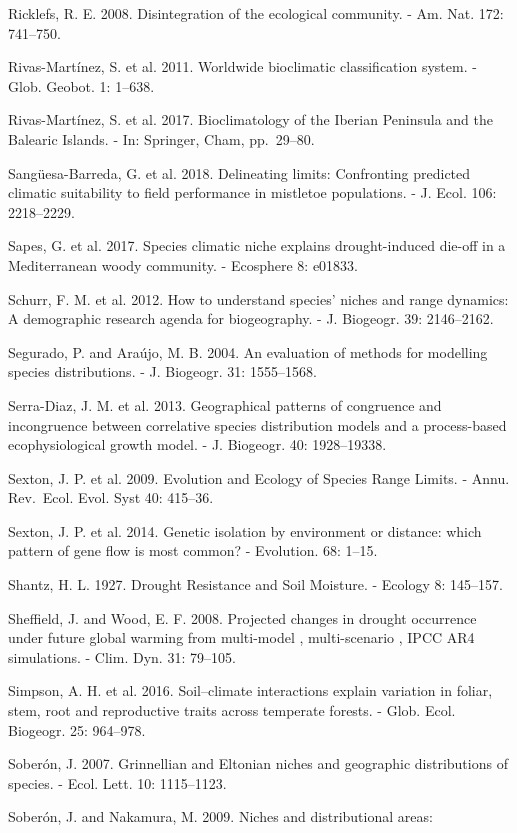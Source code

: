 \documentclass[11pt,twoside]{reedthesis}
\begin{document}
Ricklefs, R. E. 2008. Disintegration of the ecological community. - Am.
Nat. 172: 741--750.\par
Rivas-Martínez, S. et al. 2011. Worldwide bioclimatic classification
system. - Glob. Geobot. 1: 1--638.\par
Rivas-Martínez, S. et al. 2017. Bioclimatology of the Iberian Peninsula
and the Balearic Islands. - In: Springer, Cham, pp.~29--80.\par
Sangüesa-Barreda, G. et al. 2018. Delineating limits: Confronting
predicted climatic suitability to field performance in mistletoe
populations. - J. Ecol. 106: 2218--2229.\par
Sapes, G. et al. 2017. Species climatic niche explains drought-induced
die-off in a Mediterranean woody community. - Ecosphere 8: e01833.\par
Schurr, F. M. et al. 2012. How to understand species' niches and range
dynamics: A demographic research agenda for biogeography. - J. Biogeogr.
39: 2146--2162.\par
Segurado, P. and Araújo, M. B. 2004. An evaluation of methods for
modelling species distributions. - J. Biogeogr. 31: 1555--1568.\par
Serra-Diaz, J. M. et al. 2013. Geographical patterns of congruence and
incongruence between correlative species distribution models and a
process-based ecophysiological growth model. - J. Biogeogr. 40:
1928--19338.\par
Sexton, J. P. et al. 2009. Evolution and Ecology of Species Range
Limits. - Annu. Rev.~Ecol. Evol. Syst 40: 415--36.\par
Sexton, J. P. et al. 2014. Genetic isolation by environment or distance:
which pattern of gene flow is most common? - Evolution. 68: 1--15.\par
Shantz, H. L. 1927. Drought Resistance and Soil Moisture. - Ecology 8:
145--157.\par
Sheffield, J. and Wood, E. F. 2008. Projected changes in drought
occurrence under future global warming from multi-model , multi-scenario
, IPCC AR4 simulations. - Clim. Dyn. 31: 79--105.\par
Simpson, A. H. et al. 2016. Soil--climate interactions explain variation
in foliar, stem, root and reproductive traits across temperate forests.
- Glob. Ecol. Biogeogr. 25: 964--978.\par
Soberón, J. 2007. Grinnellian and Eltonian niches and geographic
distributions of species. - Ecol. Lett. 10: 1115--1123.\par
Soberón, J. and Nakamura, M. 2009. Niches and distributional areas:
\end{document}
